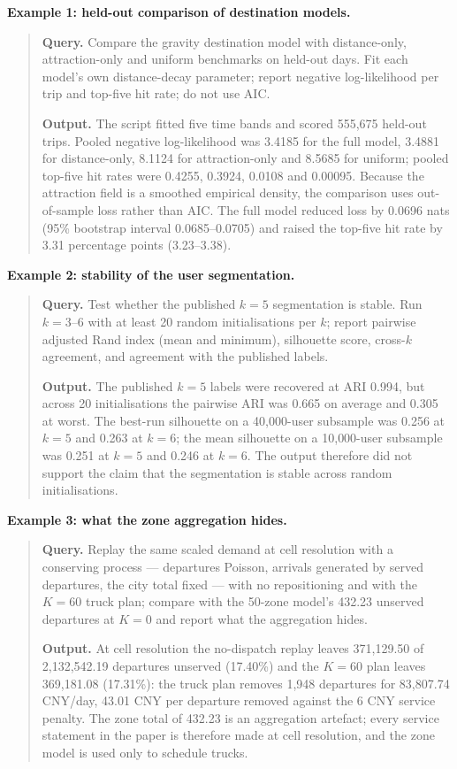 \noindent\textbf{Example 1: held-out comparison of destination models.}
\begin{quote}
\small
\textbf{Query.} Compare the gravity destination model with distance-only,
attraction-only and uniform benchmarks on held-out days. Fit each model's own
distance-decay parameter; report negative log-likelihood per trip and top-five hit
rate; do not use AIC.

\textbf{Output.} The script fitted five time bands and scored 555{,}675 held-out
trips. Pooled negative log-likelihood was 3.4185 for the full model, 3.4881 for
distance-only, 8.1124 for attraction-only and 8.5685 for uniform; pooled top-five
hit rates were 0.4255, 0.3924, 0.0108 and 0.00095. Because the attraction field is a
smoothed empirical density, the comparison uses out-of-sample loss rather than AIC.
The full model reduced loss by 0.0696 nats (95\% bootstrap interval 0.0685--0.0705)
and raised the top-five hit rate by 3.31 percentage points (3.23--3.38).
\end{quote}

\noindent\textbf{Example 2: stability of the user segmentation.}
\begin{quote}
\small
\textbf{Query.} Test whether the published $k=5$ segmentation is stable. Run
$k=3$--$6$ with at least 20 random initialisations per $k$; report pairwise adjusted
Rand index (mean and minimum), silhouette score, cross-$k$ agreement, and agreement
with the published labels.

\textbf{Output.} The published $k=5$ labels were recovered at ARI 0.994, but across
20 initialisations the pairwise ARI was 0.665 on average and 0.305 at worst. The
best-run silhouette on a 40{,}000-user subsample was 0.256 at $k=5$ and 0.263 at
$k=6$; the mean silhouette on a 10{,}000-user subsample was 0.251 at $k=5$ and 0.246
at $k=6$. The output therefore did not support the claim that the segmentation is
stable across random initialisations.
\end{quote}

\noindent\textbf{Example 3: what the zone aggregation hides.}
\begin{quote}
\small
\textbf{Query.} Replay the same scaled demand at cell resolution with a conserving
process --- departures Poisson, arrivals generated by served departures, the city total
fixed --- with no repositioning and with the $K=60$ truck plan; compare with the
50-zone model's 432.23 unserved departures at $K=0$ and report what the aggregation
hides.

\textbf{Output.} At cell resolution the no-dispatch replay leaves 371{,}129.50 of
2{,}132{,}542.19 departures unserved (17.40\%) and the $K=60$ plan leaves 369{,}181.08
(17.31\%): the truck plan removes 1{,}948 departures for 83{,}807.74 CNY/day, 43.01 CNY
per departure removed against the 6 CNY service penalty. The zone total of 432.23 is an
aggregation artefact; every service statement in the paper is therefore made at cell
resolution, and the zone model is used only to schedule trucks.
\end{quote}


